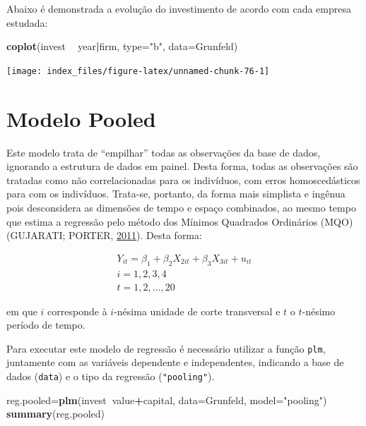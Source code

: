 \documentclass[12pt,brazil,oneside]{book}
\newenvironment{Shaded}{\begin{snugshade}}{\end{snugshade}}
\newcommand{\DataTypeTok}[1]{\textcolor[rgb]{0.13,0.29,0.53}{#1}}
\newcommand{\KeywordTok}[1]{\textcolor[rgb]{0.13,0.29,0.53}{\textbf{#1}}}
\newcommand{\NormalTok}[1]{#1}
\newcommand{\OperatorTok}[1]{\textcolor[rgb]{0.81,0.36,0.00}{\textbf{#1}}}
\newcommand{\StringTok}[1]{\textcolor[rgb]{0.31,0.60,0.02}{#1}}
\begin{document}
Abaixo é demonstrada a evolução do investimento de acordo com cada empresa estudada:

\begin{Shaded}
\begin{Highlighting}[]
\KeywordTok{coplot}\NormalTok{(invest }\OperatorTok{~}\StringTok{ }\NormalTok{year}\OperatorTok{|}\NormalTok{firm, }\DataTypeTok{type=}\StringTok{"b"}\NormalTok{, }\DataTypeTok{data=}\NormalTok{Grunfeld)}
\end{Highlighting}
\end{Shaded}

\begin{center}\texttt{[image: index\_files/figure-latex/unnamed-chunk-76-1]} \end{center}

\hypertarget{modelo-pooled}{%
\section{Modelo Pooled}\label{modelo-pooled}}

Este modelo trata de ``empilhar'' todas as observações da base de dados, ignorando a estrutura de dados em painel. Desta forma, todas as observações são tratadas como não correlacionadas para os indivíduos, com erros homoscedásticos para com os indivíduos. Trata-se, portanto, da forma mais simplista e ingênua pois desconsidera as dimensões de tempo e espaço combinados, ao mesmo tempo que estima a regressão pelo método dos Mínimos Quadrados Ordinários (MQO) (GUJARATI; PORTER, \protect\hyperlink{ref-Gujarati2011}{2011}). Desta forma:

\[
 \begin{matrix}
Y_{it} = \beta_1+\beta_2X_{2it} + \beta_3X_{3it} +u_{it}\\
i=1,2,3,4\\
t=1,2,\dots,20
 \end{matrix}
\]

em que \(i\) corresponde à \(i\)-nésima unidade de corte transversal e \(t\) o \(t\)-nésimo período de tempo.

Para executar este modelo de regressão é necessário utilizar a função \texttt{plm}, juntamente com as variáveis dependente e independentes, indicando a base de dados (\texttt{data}) e o tipo da regressão (\texttt{"pooling"}).

\begin{Shaded}
\begin{Highlighting}[]
\NormalTok{reg.pooled=}\KeywordTok{plm}\NormalTok{(invest}\OperatorTok{~}\NormalTok{value}\OperatorTok{+}\NormalTok{capital, }
               \DataTypeTok{data=}\NormalTok{Grunfeld, }\DataTypeTok{model=}\StringTok{"pooling"}\NormalTok{)}
\KeywordTok{summary}\NormalTok{(reg.pooled)}
\end{Highlighting}
\end{Shaded}
\end{document}
